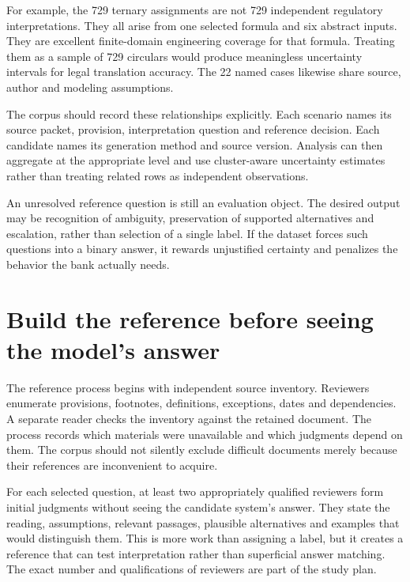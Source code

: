 
For example, the 729 ternary assignments are not 729 independent regulatory
interpretations. They all arise from one selected formula and six abstract inputs.
They are excellent finite-domain engineering coverage for that formula. Treating
them as a sample of 729 circulars would produce meaningless uncertainty intervals
for legal translation accuracy. The 22 named cases likewise share source,
author and modeling assumptions.

The corpus should record these relationships explicitly. Each scenario names its
source packet, provision, interpretation question and reference decision. Each
candidate names its generation method and source version. Analysis can then
aggregate at the appropriate level and use cluster-aware uncertainty estimates
rather than treating related rows as independent observations.

An unresolved reference question is still an evaluation object. The desired
output may be recognition of ambiguity, preservation of supported alternatives
and escalation, rather than selection of a single label. If the dataset forces
such questions into a binary answer, it rewards unjustified certainty and
penalizes the behavior the bank actually needs.

\section{Build the reference before seeing the model's answer}
\label{merge:M09:02}


The reference process begins with independent source inventory. Reviewers enumerate
provisions, footnotes, definitions, exceptions, dates and dependencies. A separate
reader checks the inventory against the retained document. The process records
which materials were unavailable and which judgments depend on them. The corpus
should not silently exclude difficult documents merely because their references
are inconvenient to acquire.

For each selected question, at least two appropriately qualified reviewers form
initial judgments without seeing the candidate system's answer. They state the
reading, assumptions, relevant passages, plausible alternatives and examples that
would distinguish them. This is more work than assigning a label, but it creates
a reference that can test interpretation rather than superficial answer matching.
The exact number and qualifications of reviewers are part of the study plan.

